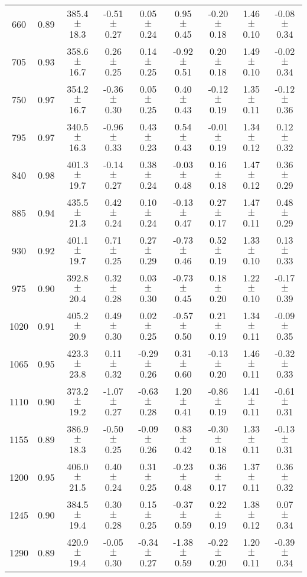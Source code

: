 \documentclass[twocolumn]{aastex61}%
\begin{document}
\begin{table*}[ht]
\begin{tabular}{ccc|ccccc|c}
660 & 0.89 & 385.4 $\pm$ 18.3 & -0.51 $\pm$ 0.27 & 0.05 $\pm$ 0.24 & 0.95 $\pm$ 0.45 & -0.20 $\pm$ 0.18 & 1.46 $\pm$ 0.10 & -0.08 $\pm$ 0.34\\
705 & 0.93 & 358.6 $\pm$ 16.7 & 0.26 $\pm$ 0.25 & 0.14 $\pm$ 0.25 & -0.92 $\pm$ 0.51 & 0.20 $\pm$ 0.18 & 1.49 $\pm$ 0.10 & -0.02 $\pm$ 0.34\\
750 & 0.97 & 354.2 $\pm$ 16.7 & -0.36 $\pm$ 0.30 & 0.05 $\pm$ 0.25 & 0.40 $\pm$ 0.43 & -0.12 $\pm$ 0.19 & 1.35 $\pm$ 0.11 & -0.12 $\pm$ 0.36\\
795 & 0.97 & 340.5 $\pm$ 16.3 & -0.96 $\pm$ 0.33 & 0.43 $\pm$ 0.23 & 0.54 $\pm$ 0.43 & -0.01 $\pm$ 0.19 & 1.34 $\pm$ 0.12 & 0.12 $\pm$ 0.32\\
840 & 0.98 & 401.3 $\pm$ 19.7 & -0.14 $\pm$ 0.27 & 0.38 $\pm$ 0.24 & -0.03 $\pm$ 0.48 & 0.16 $\pm$ 0.18 & 1.47 $\pm$ 0.12 & 0.36 $\pm$ 0.29\\
885 & 0.94 & 435.5 $\pm$ 21.3 & 0.42 $\pm$ 0.24 & 0.10 $\pm$ 0.24 & -0.13 $\pm$ 0.47 & 0.27 $\pm$ 0.17 & 1.47 $\pm$ 0.11 & 0.48 $\pm$ 0.29\\
930 & 0.92 & 401.1 $\pm$ 19.7 & 0.71 $\pm$ 0.25 & 0.27 $\pm$ 0.29 & -0.73 $\pm$ 0.46 & 0.52 $\pm$ 0.19 & 1.33 $\pm$ 0.10 & 0.13 $\pm$ 0.33\\
975 & 0.90 & 392.8 $\pm$ 20.4 & 0.32 $\pm$ 0.28 & 0.03 $\pm$ 0.30 & -0.73 $\pm$ 0.45 & 0.18 $\pm$ 0.20 & 1.22 $\pm$ 0.10 & -0.17 $\pm$ 0.39\\
1020 & 0.91 & 405.2 $\pm$ 20.9 & 0.49 $\pm$ 0.30 & 0.02 $\pm$ 0.25 & -0.57 $\pm$ 0.50 & 0.21 $\pm$ 0.19 & 1.34 $\pm$ 0.11 & -0.09 $\pm$ 0.35\\
1065 & 0.95 & 423.3 $\pm$ 23.8 & 0.11 $\pm$ 0.32 & -0.29 $\pm$ 0.26 & 0.31 $\pm$ 0.60 & -0.13 $\pm$ 0.20 & 1.46 $\pm$ 0.11 & -0.32 $\pm$ 0.33\\
1110 & 0.90 & 373.2 $\pm$ 19.2 & -1.07 $\pm$ 0.27 & -0.63 $\pm$ 0.28 & 1.20 $\pm$ 0.41 & -0.86 $\pm$ 0.19 & 1.41 $\pm$ 0.11 & -0.61 $\pm$ 0.31\\
1155 & 0.89 & 386.9 $\pm$ 18.3 & -0.50 $\pm$ 0.25 & -0.09 $\pm$ 0.26 & 0.83 $\pm$ 0.42 & -0.30 $\pm$ 0.18 & 1.33 $\pm$ 0.11 & -0.13 $\pm$ 0.31\\
1200 & 0.95 & 406.0 $\pm$ 21.5 & 0.40 $\pm$ 0.24 & 0.31 $\pm$ 0.25 & -0.23 $\pm$ 0.48 & 0.36 $\pm$ 0.17 & 1.37 $\pm$ 0.11 & 0.36 $\pm$ 0.32\\
1245 & 0.90 & 384.5 $\pm$ 19.4 & 0.30 $\pm$ 0.28 & 0.15 $\pm$ 0.25 & -0.37 $\pm$ 0.59 & 0.22 $\pm$ 0.19 & 1.38 $\pm$ 0.12 & 0.07 $\pm$ 0.34\\
1290 & 0.89 & 420.9 $\pm$ 19.4 & -0.05 $\pm$ 0.30 & -0.34 $\pm$ 0.27 & -1.38 $\pm$ 0.59 & -0.22 $\pm$ 0.20 & 1.20 $\pm$ 0.11 & -0.39 $\pm$ 0.34\\

\end{tabular}
\end{table*}
\end{document}
